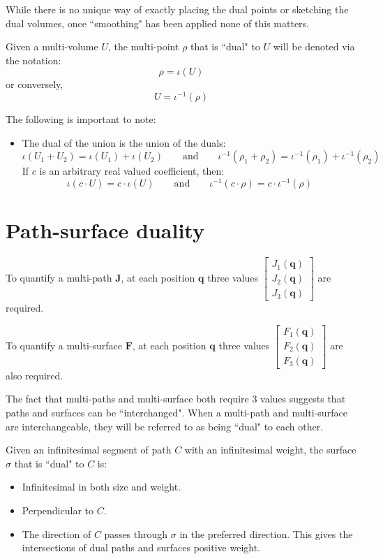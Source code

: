 \documentclass{book}
\begin{document}
While there is no unique way of exactly placing the dual points or sketching the dual volumes, once ``smoothing" has been applied none of this matters.

Given a multi-volume \(U\), the multi-point \(\rho\) that is ``dual" to \(U\) will be denoted via the notation:
\[\rho = \iota(U)\]
or conversely, 
\[U = \iota^{-1}(\rho)\]

The following is important to note:
\begin{itemize}
\item The dual of the union is the union of the duals:
\[\iota(U_1 + U_2) = \iota(U_1) + \iota(U_2)
\quad\quad\text{and}\quad\quad
\iota^{-1}(\rho_1 + \rho_2) = \iota^{-1}(\rho_1) + \iota^{-1}(\rho_2)\]
If \(c\) is an arbitrary real valued coefficient, then:
\[\iota(c \cdot U) = c \cdot \iota(U)
\quad\quad\text{and}\quad\quad
\iota^{-1}(c \cdot \rho) = c \cdot \iota^{-1}(\rho)\]
\end{itemize}




\section{Path-surface duality}

To quantify a multi-path \(\mathbf{J}\), at each position \(\mathbf{q}\) three values \(\begin{bmatrix} J_1(\mathbf{q}) \\ J_2(\mathbf{q}) \\ J_3(\mathbf{q}) \end{bmatrix}\) are required. 

To quantify a multi-surface \(\mathbf{F}\), at each position \(\mathbf{q}\) three values \(\begin{bmatrix} F_1(\mathbf{q}) \\ F_2(\mathbf{q}) \\ F_3(\mathbf{q}) \end{bmatrix}\) are also required. 

The fact that multi-paths and multi-surface both require 3 values suggests that paths and surfaces can be ``interchanged". When a multi-path and multi-surface are interchangeable, they will be referred to as being ``dual" to each other.

Given an infinitesimal segment of path \(C\) with an infinitesimal weight, the surface \(\sigma\) that is ``dual" to \(C\) is: 
\begin{itemize}
\item Infinitesimal in both size and weight.
\item Perpendicular to \(C\). 
\item The direction of \(C\) passes through \(\sigma\) in the preferred direction. This gives the intersections of dual paths and surfaces positive weight. 
\end{itemize}
\end{document}
